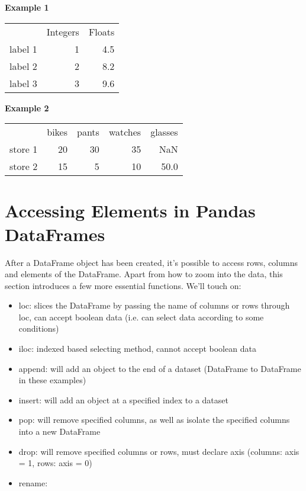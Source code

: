 \documentclass{article}
\begin{document}
\textbf{Example 1}
\begin{center}
\begin{tabular}{lrr}
	{} &  Integers &  Floats \\
	label 1 &         1 &     4.5 \\
	label 2 &         2 &     8.2 \\
	label 3 &         3 &     9.6 \\
\end{tabular}
\end{center}

\textbf{Example 2}
\begin{center}
\begin{tabular}{lrrrr}
	{} &  bikes &  pants &  watches &  glasses \\
	store 1 &     20 &     30 &       35 &      NaN \\
	store 2 &     15 &      5 &       10 &     50.0 \\
\end{tabular}
\end{center}


\section{Accessing Elements in Pandas DataFrames}\label{sec:concept5}
After a DataFrame object has been created, it's possible to access rows, columns and elements of the DataFrame. Apart from how to zoom into the data, this section introduces a few more essential functions. We'll touch on:

\begin{itemize}
	\item loc: slices the DataFrame by passing the name of columns or rows through loc, can accept boolean data (i.e. can select data according to some conditions)
	\item iloc: indexed based selecting method, cannot accept boolean data
	\item append: will add an object to the end of a dataset (DataFrame to DataFrame in these examples)
	\item insert: will add an object at a specified index to a dataset
	\item pop: will remove specified columns, as well as isolate the specified columns into a new DataFrame
	\item drop: will remove specified columns or rows, must declare axis (columns: axis = 1, rows: axis = 0)
	\item rename:
\end{itemize}
\end{document}
